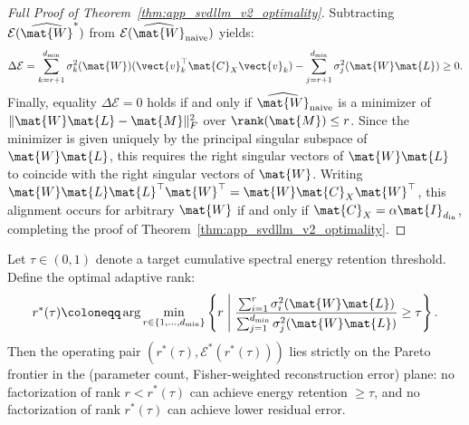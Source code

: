 \begin{proof}[Full Proof of Theorem~\ref{thm:app_svdllm_v2_optimality}]
Subtracting $\mathcal{E}(\widehat{\mat{W}}^*)$ from $\mathcal{E}(\widehat{\mat{W}}_{\text{naive}})$ yields:
\begin{equation}
\Delta \mathcal{E} = \sum_{k=r+1}^{d_{\min}} \sigma_k^2(\mat{W}) (\vect{v}_k^\top \mat{C}_X \vect{v}_k) - \sum_{j=r+1}^{d_{\min}} \sigma_j^2(\mat{W} \mat{L}) \ge 0.
\end{equation}
Finally, equality $\Delta \mathcal{E} = 0$ holds if and only if $\widehat{\mat{W}}_{\text{naive}}$ is a minimizer of $\|\mat{W}\mat{L} - \mat{M}\|_F^2$ over $\rank(\mat{M}) \le r$. Since the minimizer is given uniquely by the principal singular subspace of $\mat{W}\mat{L}$, this requires the right singular vectors of $\mat{W}\mat{L}$ to coincide with the right singular vectors of $\mat{W}$. Writing $\mat{W}\mat{L}\mat{L}^\top \mat{W}^\top = \mat{W} \mat{C}_X \mat{W}^\top$, this alignment occurs for arbitrary $\mat{W}$ if and only if $\mat{C}_X = \alpha \mat{I}_{d_{\text{in}}}$, completing the proof of Theorem~\ref{thm:app_svdllm_v2_optimality}.
\end{proof}

\begin{corollary}
\label{cor:knee_point_pareto}
Let $\tau \in (0, 1)$ denote a target cumulative spectral energy retention threshold. Define the optimal adaptive rank:
\begin{equation}
r^*(\tau) \coloneqq \arg\min_{r \in \{1, \dots, d_{\min}\}} \left\{ r \;\middle|\; \frac{\sum_{i=1}^r \sigma_i^2(\mat{W}\mat{L})}{\sum_{j=1}^{d_{\min}} \sigma_j^2(\mat{W}\mat{L})} \ge \tau \right\}.
\label{eq:knee_point_def}
\end{equation}
Then the operating pair $(r^*(\tau), \mathcal{E}^*(r^*(\tau)))$ lies strictly on the Pareto frontier in the (parameter count, Fisher-weighted reconstruction error) plane: no factorization of rank $r < r^*(\tau)$ can achieve energy retention $\ge \tau$, and no factorization of rank $r^*(\tau)$ can achieve lower residual error.
\end{corollary}

